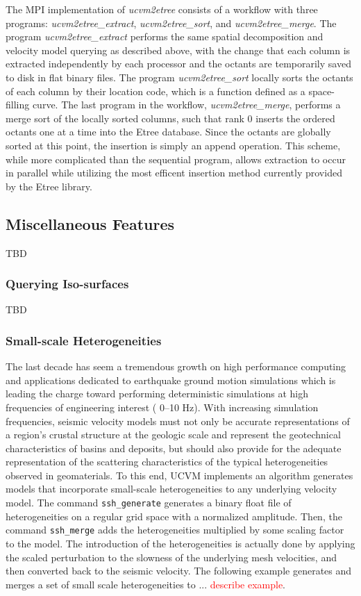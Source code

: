 The MPI implementation of \emph{ucvm2etree} consists of a workflow with three programs: \emph{ucvm2etree\_extract}, \emph{ucvm2etree\_sort}, and \emph{ucvm2etree\_merge}. The program \emph{ucvm2etree\_extract} performs the same spatial decomposition and velocity model querying as described above, with the change that each column is extracted independently by each processor and the octants are temporarily saved to disk in flat binary files. The program \emph{ucvm2etree\_sort} locally sorts the octants of each column by their location code, which is a function defined as a space-filling curve. The last program in the workflow, \emph{ucvm2etree\_merge}, performs a merge sort of the locally sorted columns, such that rank 0 inserts the ordered octants one at a time into the Etree database. Since the octants are globally sorted at this point, the insertion is simply an append operation. This scheme, while more complicated than the sequential program, allows extraction to occur in parallel while utilizing the most efficent insertion method currently provided by the Etree library.

\subsection{Miscellaneous Features}

TBD

\subsubsection{Querying Iso-surfaces}

TBD 


\subsubsection{Small-scale Heterogeneities}

The last decade has seem a tremendous growth on high performance computing and applications dedicated to earthquake ground motion simulations which is leading the charge toward performing deterministic simulations at high frequencies of engineering interest (\fmax{} 0--10 Hz). With increasing simulation frequencies, seismic velocity models must not only be accurate representations of a region's crustal structure at the geologic scale and represent the geotechnical characteristics of basins and deposits, but should also provide for the adequate representation of the scattering characteristics of the typical heterogeneities observed in geomaterials. To this end, UCVM implements an algorithm generates models that incorporate small-scale heterogeneities to any underlying velocity model. The command \texttt{ssh\_generate} generates a binary float file of heterogeneities on a regular grid space with a normalized amplitude. Then, the command \texttt{ssh\_merge} adds the heterogeneities multiplied by some scaling factor to the model. The introduction of the heterogeneities is actually done by applying the scaled perturbation to the slowness of the underlying mesh velocities, and then converted back to the seismic velocity. The following example generates and merges a set of small scale heterogeneities to ... \textcolor{red}{describe example}.

